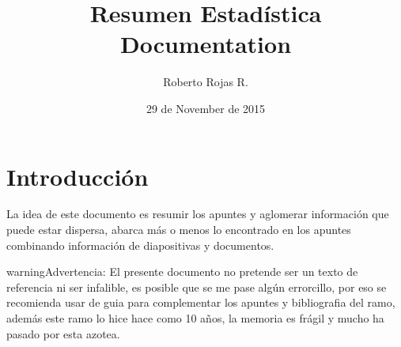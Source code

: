 \documentclass[letterpaper,10pt,openany,oneside]{sphinxmanual}
\title{Resumen Estadística Documentation}
\date{29 de November de 2015}
\author{Roberto Rojas R.}
\begin{document}
\maketitle
\tableofcontents
{}\label{index::doc}



\chapter{Introducción}
\label{Introduccion::doc}\label{Introduccion:introduccion}
La idea de este documento es resumir los apuntes y aglomerar información que puede estar
dispersa, abarca más o menos lo encontrado en los apuntes combinando información de
diapositivas y documentos.

\begin{notice}{warning}{Advertencia:}
El presente documento no pretende ser un texto de referencia ni ser infalible, es posible
que se me pase algún errorcillo, por eso se recomienda usar de guia para complementar los
apuntes y bibliografia del ramo, además este ramo lo hice hace como 10 años, la memoria es
frágil y mucho ha pasado por esta azotea.
\end{notice}
\end{document}
